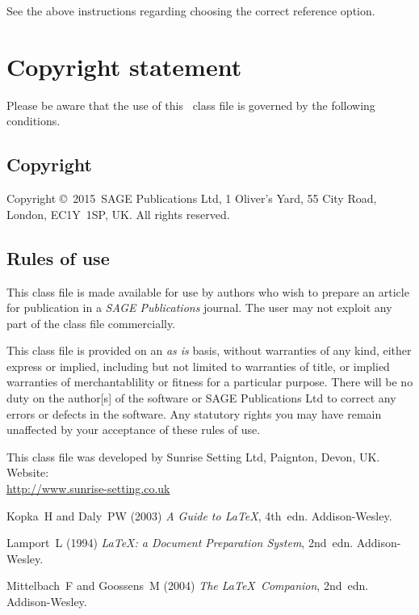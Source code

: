 \documentclass[Afour,sageh,times,doublespace]{sagej}
\def\volumeyear{2015}
\begin{document}
See the above instructions regarding choosing the correct reference option.

%

\section{Copyright statement}
Please  be  aware that the use of  this \LaTeXe\ class file is
governed by the following conditions.

\subsection{Copyright}
Copyright \copyright\ \volumeyear\ SAGE Publications Ltd,
1 Oliver's Yard, 55 City Road, London, EC1Y~1SP, UK. All
rights reserved.

\subsection{Rules of use}
This class file is made available for use by authors who wish to
prepare an article for publication in a \textit{SAGE Publications} journal.
The user may not exploit any
part of the class file commercially.

This class file is provided on an \textit{as is}  basis, without
warranties of any kind, either express or implied, including but
not limited to warranties of title, or implied  warranties of
merchantablility or fitness for a particular purpose. There will
be no duty on the author[s] of the software or SAGE Publications Ltd
to correct any errors or defects in the software. Any
statutory  rights you may have remain unaffected by your
acceptance of these rules of use.

\begin{acks}
This class file was developed by Sunrise Setting Ltd,
Paignton, Devon, UK. Website:\\
\url{http://www.sunrise-setting.co.uk}
\end{acks}

\begin{thebibliography}{99}
Kopka~H and Daly~PW (2003) \textit{A Guide to \LaTeX}, 4th~edn.
Addison-Wesley.

Lamport~L (1994) \textit{\LaTeX: a Document Preparation System},
2nd~edn. Addison-Wesley.

Mittelbach~F and Goossens~M (2004) \textit{The \LaTeX\ Companion},
2nd~edn. Addison-Wesley.

\end{thebibliography}
\end{document}
